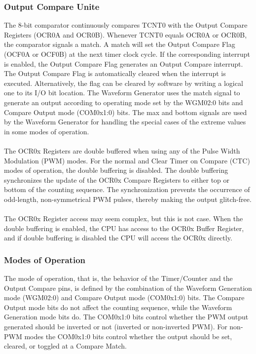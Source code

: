 \documentclass[english]{article}
\begin{document}
\subsubsection{Output Compare Unite}
The 8-bit comparator continuously compares TCNT0 with the Output Compare Registers (OCR0A and OCR0B). Whenever TCNT0 equals OCR0A or OCR0B, the comparator signals a match. A match will set the Output Compare Flag (OCF0A or OCF0B) at the next timer clock cycle. If the corresponding interrupt is enabled, the Output Compare Flag generates an Output Compare interrupt. The Output Compare Flag is automatically cleared when the interrupt is executed. Alternatively, the flag can be cleared by software by writing a logical one to its I/O bit location. The Waveform Generator uses the match signal to generate an output according to operating mode set by the WGM02:0 bits and Compare Output mode (COM0x1:0) bits. The max and bottom signals are used by the Waveform Generator for handling the special cases of the extreme values in some modes of operation.\\\\
The OCR0x Registers are double buffered when using any of the Pulse Width Modulation (PWM) modes. For the normal and Clear Timer on Compare (CTC) modes of operation, the double buffering is disabled. The double buffering synchronizes the update of the OCR0x Compare Registers to either top or bottom of the counting sequence. The synchronization prevents the occurrence of odd-length, non-symmetrical PWM pulses, thereby making the output glitch-free.\\\\ The OCR0x Register access may seem
complex, but this is not case. When the double buffering is enabled, the CPU has access to the OCR0x Buffer Register, and if double buffering is disabled the CPU will access the OCR0x directly.
\subsubsection{Modes of Operation}
The mode of operation, that is, the behavior of the Timer/Counter and the Output Compare pins, is defined by the combination of the Waveform Generation mode (WGM02:0) and Compare Output mode (COM0x1:0) bits. The Compare Output mode bits do not affect the counting sequence, while the Waveform Generation mode bits do. The COM0x1:0 bits control whether the PWM output generated should be inverted or not (inverted or non-inverted PWM). For non-PWM modes the COM0x1:0 bits control whether the output should be set, cleared, or toggled at a Compare Match. 
\end{document}

